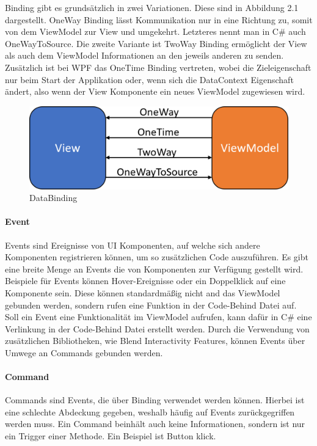 \documentclass[titlepage=false,12pt]{scrreprt}
\begin{document}
Binding gibt es grundsätzlich in zwei Variationen. Diese sind in Abbildung 2.1 dargestellt. OneWay Binding
lässt Kommunikation nur in eine Richtung zu, somit von dem ViewModel zur View und umgekehrt.
Letzteres nennt man in C\# auch OneWayToSource. Die zweite Variante ist TwoWay Binding ermöglicht
der View als auch dem ViewModel Informationen an den jeweils anderen zu senden. Zusätzlich ist 
bei WPF das OneTime Binding vertreten, wobei die Zieleigenschaft nur beim Start der Applikation 
oder, wenn sich die DataContext Eigenschaft ändert, also wenn der View Komponente ein neues 
ViewModel zugewiesen wird.

\begin{figure}[h]
	\includegraphics[width=\textwidth]{Wpf_Binding.png}
	\caption[]{DataBinding}
\end{figure}


\paragraph{Event}

Events sind Ereignisse von UI Komponenten, auf welche sich andere Komponenten registrieren 
können, um so zusätzlichen Code auszuführen. Es gibt eine breite Menge an Events die
von Komponenten zur Verfügung gestellt wird. Beispiele für Events können Hover-Ereignisse
oder ein Doppelklick auf eine Komponente sein.
Diese können standardmäßig nicht and das ViewModel
gebunden werden, sondern rufen eine Funktion in der Code-Behind Datei auf.
Soll ein Event eine Funktionalität im ViewModel aufrufen, kann dafür in C\# eine Verlinkung in der
Code-Behind Datei erstellt werden. Durch die Verwendung von zusätzlichen Bibliotheken, wie
Blend Interactivity Features, können Events über Umwege an Commands gebunden werden.

\paragraph{Command}

Commands sind Events, die über Binding verwendet werden können. Hierbei ist eine schlechte
Abdeckung gegeben, weshalb häufig auf Events zurückgegriffen werden muss. Ein Command
beinhält auch keine Informationen, sondern ist nur ein Trigger einer Methode. Ein Beispiel
ist Button klick.
\end{document}
